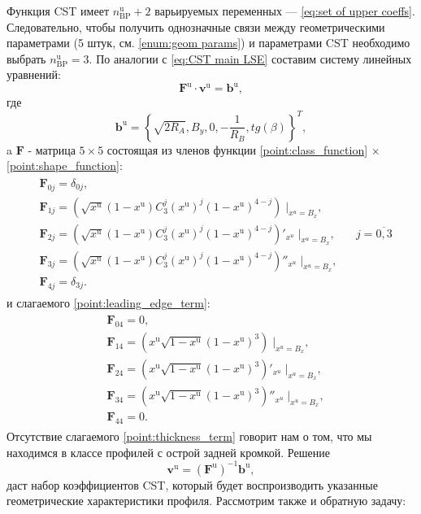Функция CST имеет $n^\text{u}_\text{BP} + 2$ варьируемых переменных --- \ref{eq:set of upper coeffs}. Следовательно, чтобы получить однозначные связи между геометрическими параметрами (5 штук, см. \ref{enum:geom params}) и параметрами CST необходимо выбрать $n^\text{u}_\text{BP} = 3$. По аналогии с \ref{eq:CST main LSE} составим систему линейных уравнений:
\begin{equation*}
  \mathbf{F}^\text{u} \cdot \mathbf{v}^\text{u} = \mathbf{b}^\text{u},
\end{equation*}
где
\begin{equation*}
  \mathbf{b}^\text{u} = \left\{ \sqrt{2 R_A}, B_y, 0, - \frac{1}{R_B}, tg(\beta) \right\}^T,
\end{equation*}
a $ \mathbf{F} $ - матрица $5 \times 5$ состоящая из членов функции \ref{point:class_function} $\times$ \ref{point:shape_function}:
\begin{eqnarray*}
  \begin{aligned}
    &\mathbf{F}_{0j} = \delta_{0j}, \\
    &\mathbf{F}_{1j} = \left(\sqrt{x^\text{u}}(1 - x^\text{u})C^{j}_{3}(x^\text{u})^{j}(1 - x^\text{u})^{4 - j}\right) \; \bigg|_{x^u = B_x}, \\
    &\mathbf{F}_{2j} = \left(\sqrt{x^\text{u}}(1 - x^\text{u})C^{j}_{3}(x^\text{u})^{j}(1 -x^\text{u})^{4 - j}\right)'_{x^u} \; \bigg|_{x^u = B_x}, && j = \overline{0,3} \\
    &\mathbf{F}_{3j} = \left(\sqrt{x^\text{u}}(1 - x^\text{u})C^{j}_{3}(x^\text{u})^{j}(1 - x^\text{u})^{4 - j}\right)''_{x^u} \; \bigg|_{x^u = B_x}, \\
    &\mathbf{F}_{4j} = \delta_{3j}.
  \end{aligned}
\end{eqnarray*}
и слагаемого \ref{point:leading_edge_term}:
\begin{eqnarray*}
  \begin{aligned}
    &\mathbf{F}_{04} = 0, \\
    &\mathbf{F}_{14} = \left( x^\text{u}\sqrt{1 - x^\text{u}}(1 - x^\text{u})^{3} \right) \; \bigg|_{x^u = B_x}, \\
    &\mathbf{F}_{24} = \left( x^\text{u}\sqrt{1 - x^\text{u}}(1 - x^\text{u})^{3}\right)'_{x^u} \; \bigg|_{x^u = B_x}, \\
    &\mathbf{F}_{34} = \left( x^\text{u}\sqrt{1 - x^\text{u}}(1 - x^\text{u})^{3}\right)''_{x^u} \; \bigg|_{x^u = B_x}, \\
    &\mathbf{F}_{44} = 0.
  \end{aligned}
\end{eqnarray*}
Отсутствие слагаемого \ref{point:thickness_term} говорит нам о том, что мы находимся в классе профилей с острой задней кромкой. Решение
\begin{equation*}
  \mathbf{v}^\text{u} = \left( \mathbf{F}^\text{u} \right)^{-1} \mathbf{b}^\text{u},
\end{equation*}
даст набор коэффициентов CST, который будет воспроизводить указанные геометрические характеристики профиля.
Рассмотрим также и обратную задачу:

